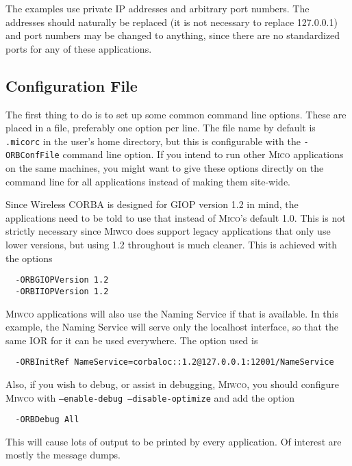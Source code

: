 \documentclass[12pt,a4paper,draft]{article}
\newcommand{\MICO}{\textsc{Mico}}
\newcommand{\MIWCO}{\textsc{Miwco}}
\begin{document}
The examples use private IP addresses and arbitrary port numbers.  The
addresses should naturally be replaced (it is not necessary to replace
127.0.0.1) and port numbers may be changed to anything, since there
are no standardized ports for any of these applications.

\subsection{Configuration File}

The first thing to do is to set up some common command line options.
These are placed in a file, preferably one option per line.  The file
name by default is \texttt{.micorc} in the user's home directory, but
this is configurable with the \texttt{-ORBConfFile} command line
option.  If you intend to run other \MICO{} applications on the same
machines, you might want to give these options directly on the command
line for all applications instead of making them site-wide.

Since Wireless CORBA is designed for GIOP version 1.2 in mind, the
applications need to be told to use that instead of \MICO{}'s default
1.0.  This is not strictly necessary since \MIWCO{} does support
legacy applications that only use lower versions, but using 1.2
throughout is much cleaner.  This is achieved with the options

\small
\begin{verbatim}
  -ORBGIOPVersion 1.2
  -ORBIIOPVersion 1.2
\end{verbatim}
\normalsize

\MIWCO{} applications will also use the Naming Service if that is
available.  In this example, the Naming Service will serve only the
localhost interface, so that the same IOR for it can be used
everywhere.  The option used is

\small
\begin{verbatim}
  -ORBInitRef NameService=corbaloc::1.2@127.0.0.1:12001/NameService
\end{verbatim}
\normalsize

Also, if you wish to debug, or assist in debugging, \MIWCO{}, you
should configure \MIWCO{} with \texttt{--enable-debug
  --disable-optimize} and add the option

\small
\begin{verbatim}
  -ORBDebug All
\end{verbatim}
\normalsize

This will cause lots of output to be printed by every application.  Of
interest are mostly the message dumps.
\end{document}
